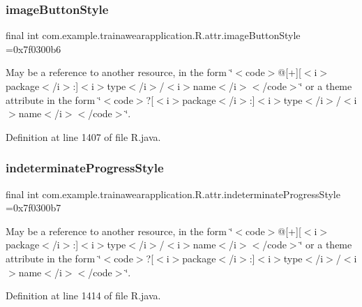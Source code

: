 \subsubsection{\texorpdfstring{imageButtonStyle}{imageButtonStyle}}
{\footnotesize\ttfamily final int com.\+example.\+trainawearapplication.\+R.\+attr.\+image\+Button\+Style =0x7f0300b6\hspace{0.3cm}{\ttfamily [static]}}

May be a reference to another resource, in the form \char`\"{}$<$code$>$@\mbox{[}+\mbox{]}\mbox{[}$<$i$>$package$<$/i$>$\+:\mbox{]}$<$i$>$type$<$/i$>$/$<$i$>$name$<$/i$>$$<$/code$>$\char`\"{} or a theme attribute in the form \char`\"{}$<$code$>$?\mbox{[}$<$i$>$package$<$/i$>$\+:\mbox{]}$<$i$>$type$<$/i$>$/$<$i$>$name$<$/i$>$$<$/code$>$\char`\"{}. 

Definition at line 1407 of file R.\+java.

\mbox{\label{classcom_1_1example_1_1trainawearapplication_1_1_r_1_1attr_a805b57524eb246cf099c81c1f716646d}} 
\subsubsection{\texorpdfstring{indeterminateProgressStyle}{indeterminateProgressStyle}}
{\footnotesize\ttfamily final int com.\+example.\+trainawearapplication.\+R.\+attr.\+indeterminate\+Progress\+Style =0x7f0300b7\hspace{0.3cm}{\ttfamily [static]}}

May be a reference to another resource, in the form \char`\"{}$<$code$>$@\mbox{[}+\mbox{]}\mbox{[}$<$i$>$package$<$/i$>$\+:\mbox{]}$<$i$>$type$<$/i$>$/$<$i$>$name$<$/i$>$$<$/code$>$\char`\"{} or a theme attribute in the form \char`\"{}$<$code$>$?\mbox{[}$<$i$>$package$<$/i$>$\+:\mbox{]}$<$i$>$type$<$/i$>$/$<$i$>$name$<$/i$>$$<$/code$>$\char`\"{}. 

Definition at line 1414 of file R.\+java.

\mbox{\label{classcom_1_1example_1_1trainawearapplication_1_1_r_1_1attr_a59ea400c1306a46e4f0e832091d965a6}} 
